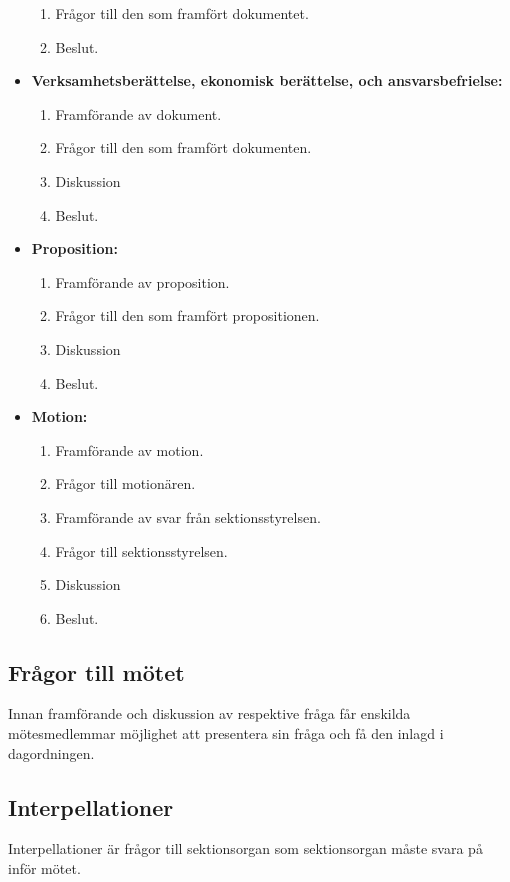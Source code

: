 \documentclass[11pt, includeaddress]{classes/cthit}
\begin{document}
\begin{itemize}
\begin{enumerate}
        \item Frågor till den som framfört dokumentet.
        \item Beslut.
    \end{enumerate}
    \item \textbf{Verksamhetsberättelse, ekonomisk berättelse, och ansvarsbefrielse:}
    \begin{enumerate}
        \item Framförande av dokument.
        \item Frågor till den som framfört dokumenten.
        \item Diskussion
        \item Beslut.
    \end{enumerate}
    \item \textbf{Proposition:}
    \begin{enumerate}
        \item Framförande av proposition.
        \item Frågor till den som framfört propositionen.
        \item Diskussion
        \item Beslut.
    \end{enumerate}
    \item \textbf{Motion:}
    \begin{enumerate}
        \item Framförande av motion.
        \item Frågor till motionären.
        \item Framförande av svar från sektionsstyrelsen.
        \item Frågor till sektionsstyrelsen.
        \item Diskussion
        \item Beslut.
    \end{enumerate}
\end{itemize}
\subsection{Frågor till mötet}
Innan framförande och diskussion av respektive fråga får enskilda mötesmedlemmar möjlighet att presentera sin fråga och få den inlagd i dagordningen.
\subsection{Interpellationer}
Interpellationer är frågor till sektionsorgan som sektionsorgan måste svara på inför mötet.
\end{document}
